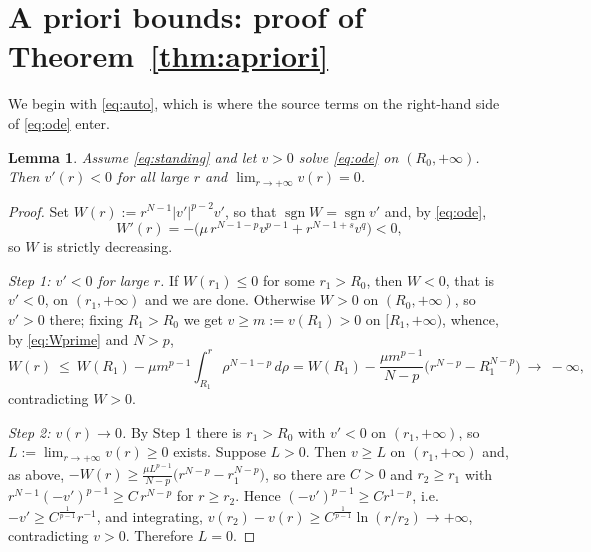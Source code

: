 \documentclass[11pt,reqno]{amsart}
\numberwithin{equation}{section}
\theoremstyle{plain}
\newtheorem{lemma}[theorem]{Lemma}
\theoremstyle{definition}
\DeclareMathOperator{\sgn}{sgn}
\begin{document}
\section{A priori bounds: proof of Theorem~\ref{thm:apriori}}\label{sec:apriori}

We begin with \eqref{eq:auto}, which is where the source terms on the
right-hand side of \eqref{eq:ode} enter.

\begin{lemma}\label{lem:auto}
Assume \eqref{eq:standing} and let $v>0$ solve \eqref{eq:ode} on
$(R_{0},+\infty)$. Then $v'(r)<0$ for all large $r$ and
$\lim_{r\to+\infty}v(r)=0$.
\end{lemma}

\begin{proof}
Set $W(r):=r^{N-1}|v'|^{p-2}v'$, so that $\sgn W=\sgn v'$ and, by
\eqref{eq:ode},
\begin{equation}\label{eq:Wprime}
W'(r)=-\big(\mu\,r^{N-1-p}v^{p-1}+r^{N-1+s}v^{q}\big)<0 ,
\end{equation}
so $W$ is strictly decreasing.

\emph{Step 1: $v'<0$ for large $r$.} If $W(r_{1})\le0$ for some
$r_{1}>R_{0}$, then $W<0$, that is $v'<0$, on $(r_{1},+\infty)$ and we are
done. Otherwise $W>0$ on $(R_{0},+\infty)$, so $v'>0$ there; fixing
$R_{1}>R_{0}$ we get $v\ge m:=v(R_{1})>0$ on $[R_{1},+\infty)$, whence, by
\eqref{eq:Wprime} and $N>p$,
\[
W(r)\ \le\ W(R_{1})-\mu m^{p-1}\!\!\int_{R_{1}}^{r}\!\rho^{N-1-p}\,d\rho
=W(R_{1})-\frac{\mu m^{p-1}}{N-p}\big(r^{N-p}-R_{1}^{N-p}\big)
\ \longrightarrow\ -\infty ,
\]
contradicting $W>0$.

\emph{Step 2: $v(r)\to0$.} By Step 1 there is $r_{1}>R_{0}$ with $v'<0$ on
$(r_{1},+\infty)$, so $L:=\lim_{r\to+\infty}v(r)\ge0$ exists. Suppose $L>0$.
Then $v\ge L$ on $(r_{1},+\infty)$ and, as above,
$-W(r)\ge\frac{\mu L^{p-1}}{N-p}\big(r^{N-p}-r_{1}^{N-p}\big)$, so there are
$C>0$ and $r_{2}\ge r_{1}$ with $r^{N-1}(-v')^{p-1}\ge C\,r^{N-p}$ for
$r\ge r_{2}$. Hence $(-v')^{p-1}\ge C r^{1-p}$, i.e.
$-v'\ge C^{\frac{1}{p-1}}r^{-1}$, and integrating,
$v(r_{2})-v(r)\ge C^{\frac{1}{p-1}}\ln(r/r_{2})\to+\infty$, contradicting
$v>0$. Therefore $L=0$.
\end{proof}
\end{document}
